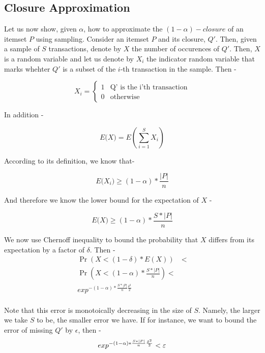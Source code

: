 \subsection{Closure Approximation}
Let us now show, given $\alpha$, how to approximate the
$(1-\alpha)-closure$ of an itemset $P$ using sampling.
Consider an itemset $P$ and its closure, $Q'$. Then, given a
sample of $S$ transactions, denote by $X$ the number of
occurences of $Q'$. Then, $X$ is a random variable and let
us denote by $X_i$ the indicator random variable that marks
whehter $Q'$ is a subset of the $i$-th transaction in the
sample. Then -

\[
 X_i =
  \begin{cases}
   1       & \text{Q' is the i'th transaction}\\
   0       & \text{otherwise}
  \end{cases}
\]

In addition - 

\[ {E({X)}} =
{E(\sum\limits_{i=1}^{S}{X_i})}
\]

According to its definition, we know that-

\[ {E({X_i)}} \geq
(1-\alpha)*\frac{\left\vert{P}\right\vert}{n}
\]

And therefore we know the lower bound for the expectation of
$X$ - 

\[ {E({X)}} \geq
(1-\alpha)*\frac{S * \left\vert{P}\right\vert}{n}
\]

We now use Chernoff inequality to bound the probability
that $X$ differs from its expectation by a factor of
$\delta$. Then - 
\begin{equation*}
\begin{split}
\Pr(X < (1-\delta)*E(X)) & < \\
\Pr(X < (1-\alpha)*\frac{S * \left\vert{P}\right\vert}{n}) < \\
exp^{-(1-\alpha)*\frac{S *\left\vert{P}\right\vert}{n}\frac{\delta^2}{2}} \\
\end{split}
\end{equation*}

Note that this error is monotoically decreasing in the size
of $S$. Namely, the larger we take $S$ to be, the smaller
error we have. If for instance, we want to bound the error
of missing $Q'$ by $\epsilon$, then -
\begin{equation}
exp^{-(1-\alpha)*\frac{S
*\left\vert{P}\right\vert}{n}\frac{\delta^2}{2}} <
\epsilon\\
\end{equation}

